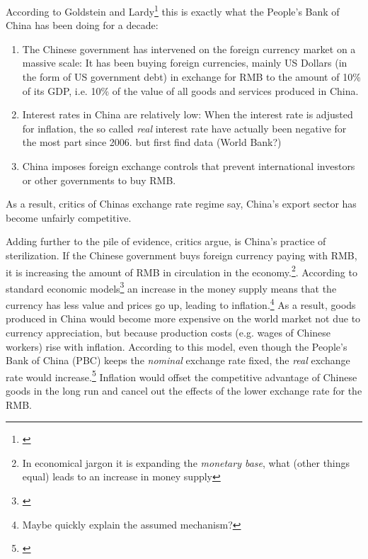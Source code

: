 According to Goldstein and Lardy\footnote{\cite[pp.  
40]{GoldsteinLardy2008}}  this is exactly what the People's Bank of 
China has been doing for a decade:

\begin{enumerate}
\item{The Chinese government has intervened on the foreign currency 
		market on a massive scale: It has been buying foreign 
		currencies, mainly US Dollars (in the form of US government 
		debt) in exchange for RMB to the amount of 10\% of its GDP, i.e. 
		10\% of the value of all goods and services produced in China.} 
\item{Interest rates in China are relatively low: When the interest rate 
	is adjusted for inflation, the so called \emph{real} interest rate 
have actually been negative for the most part since 2006.} %
but first find data (World Bank?)
\item{China imposes foreign exchange controls that prevent international investors or other governments to buy RMB.}%
\end{enumerate}

As a result, critics of Chinas exchange rate regime say, China's export 
sector has become unfairly competitive. 


Adding further to the pile of evidence, critics argue, is China's 
practice of sterilization. If the Chinese government buys foreign 
currency paying with RMB, it is increasing the amount of RMB in 
circulation in the economy.\footnote{In economical jargon it is 
expanding the \emph{monetary base}, what (other things equal) leads to 
an increase in money supply}. According to standard economic 
models\footnote{\cite[pp. ?]{Krugman2008}} an increase in the money 
supply means that the currency has less value and prices go up, leading 
to inflation.\footnote{Maybe quickly explain the assumed mechanism?} As 
a result, goods produced in China would become more expensive on the 
world market not due to currency appreciation, but because production 
costs (e.g. wages of Chinese workers) rise with inflation. According to 
this model, even though the People's Bank of China (PBC) keeps the 
\emph{nominal} exchange rate fixed, the \emph{real} exchange rate would 
increase.\footnote{\cite[p. 509]{Krugman}} Inflation would offset the 
competitive advantage of Chinese goods in the long run and cancel out 
the effects of the lower exchange rate for the RMB.

